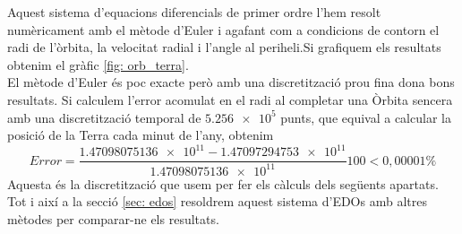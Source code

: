 \documentclass[11pt]{article}
\begin{document}
Aquest sistema d'equacions diferencials de primer ordre l'hem resolt numèricament amb el mètode d'Euler i agafant com a condicions de contorn el radi de l'òrbita, la velocitat radial i l'angle al periheli.\footnotemark[\value{footnote}]
Si grafiquem els resultats obtenim el gràfic \ref{fig: orb_terra}.\\
El mètode d'Euler és poc exacte però amb una discretització prou fina dona bons resultats. Si calculem l'error acomulat en el radi al completar una Òrbita sencera amb una discretització temporal de $\num{5.256e5}$ punts, que equival a calcular la posició de la Terra cada minut de l'any, obtenim
\begin{equation}
    Error = \frac{\num{1.47098075136e11}-\num{1.47097294753e11}}{\num{1.47098075136e11}}100<0,00001\%
\end{equation}
Aquesta és la discretització que usem per fer els càlculs dels següents apartats.
Tot i així a la secció \ref{sec: edos} resoldrem aquest sistema d'EDOs amb altres mètodes per comparar-ne els resultats.
\end{document}

